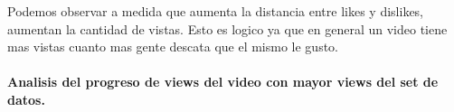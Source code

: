             \begin{figure}[ht]
            \end{figure}
        \FloatBarrier
        Podemos observar a medida que aumenta la distancia entre likes y dislikes,
        aumentan la cantidad de vistas. Esto es logico ya que en general un video
        tiene mas vistas cuanto mas gente descata que el mismo le gusto.
        \newpage

        \paragraph{Analisis del progreso de views del video con mayor views del set de datos.}

